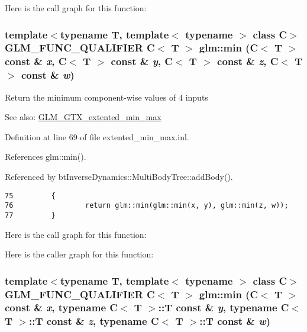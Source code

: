 Here is the call graph for this function:\hypertarget{group__gtx__extented__min__max_gca95a5fd4be0ad53f4474e69867bf974}{
\subsubsection[min]{\setlength{\rightskip}{0pt plus 5cm}template$<$typename T, template$<$ typename $>$ class C$>$ GLM\_\-FUNC\_\-QUALIFIER C$<$ T $>$ glm::min (C$<$ T $>$ const \& {\em x}, \/  C$<$ T $>$ const \& {\em y}, \/  C$<$ T $>$ const \& {\em z}, \/  C$<$ T $>$ const \& {\em w})}}
\label{group__gtx__extented__min__max_gca95a5fd4be0ad53f4474e69867bf974}


Return the minimum component-wise values of 4 inputs \begin{Desc}
\item[See also:]\hyperlink{group__gtx__extented__min__max}{GLM\_\-GTX\_\-extented\_\-min\_\-max} \end{Desc}


Definition at line 69 of file extented\_\-min\_\-max.inl.

References glm::min().

Referenced by btInverseDynamics::MultiBodyTree::addBody().

\begin{Code}\begin{verbatim}75         {
76                 return glm::min(glm::min(x, y), glm::min(z, w));
77         }
\end{verbatim}
\end{Code}




Here is the call graph for this function:

Here is the caller graph for this function:\hypertarget{group__gtx__extented__min__max_g8c81655ede8d78e3c7d8294cdef3f483}{
\subsubsection[min]{\setlength{\rightskip}{0pt plus 5cm}template$<$typename T, template$<$ typename $>$ class C$>$ GLM\_\-FUNC\_\-QUALIFIER C$<$ T $>$ glm::min (C$<$ T $>$ const \& {\em x}, \/  typename C$<$ T $>$::T const \& {\em y}, \/  typename C$<$ T $>$::T const \& {\em z}, \/  typename C$<$ T $>$::T const \& {\em w})}}
\label{group__gtx__extented__min__max_g8c81655ede8d78e3c7d8294cdef3f483}



